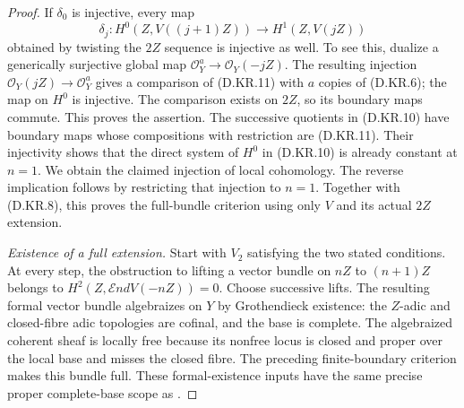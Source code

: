 \begin{proof}
If $\delta_0$ is injective, every map
\[
 \delta_j:H^0(Z,V((j+1)Z))\longrightarrow H^1(Z,V(jZ))
                                                        \tag{D.KR.11}
\]
obtained by twisting the $2Z$ sequence is injective as well.
To see this, dualize a generically surjective global map
$\mathcal O_Y^a\to\mathcal O_Y(-jZ)$. The resulting injection
$\mathcal O_Y(jZ)\to\mathcal O_Y^a$ gives a comparison of
(D.KR.11) with $a$ copies of (D.KR.6); the map on $H^0$
is injective. The comparison exists on $2Z$, so its boundary
maps commute. This proves the assertion.
The successive quotients in (D.KR.10) have boundary maps
whose compositions with restriction are (D.KR.11).
Their injectivity shows that the direct system of $H^0$ in
(D.KR.10) is already constant at $n=1$. We obtain the claimed
injection of local cohomology. The reverse implication follows
by restricting that injection to $n=1$.
Together with (D.KR.8), this proves the full-bundle criterion
using only $V$ and its actual $2Z$ extension.

\emph{Existence of a full extension.}
Start with $V_2$ satisfying the two stated conditions. At every
step, the obstruction to lifting a vector bundle on $nZ$ to
$(n+1)Z$ belongs to
$H^2(Z,\mathcal End V(-nZ))=0$. Choose successive lifts.
The resulting formal vector bundle algebraizes on $Y$ by
Grothendieck existence: the $Z$-adic and closed-fibre adic
topologies are cofinal, and the base is complete. The
algebraized coherent sheaf is locally free because its
nonfree locus is closed and proper over the local base and
misses the closed fibre. The preceding finite-boundary
criterion makes this bundle full. These formal-existence
inputs have the same precise proper complete-base scope as
\citep[Tags 0885, 08MF, 08MD and 02OC]{C_StacksBoundedReflexive}.


\end{proof}
